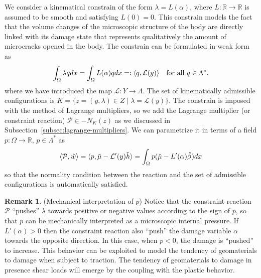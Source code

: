 \documentclass[a4paper,10pt,twoside]{amsbook}
\numberwithin{section}{chapter}
\numberwithin{equation}{chapter}
\theoremstyle{definition}
\newtheorem{rmk}[prop]{Remark}
\DeclarePairedDelimiter{\dual}{\langle}{\rangle}
\begin{document}
 We consider a kinematical constrain of the form $\lambda=L(\alpha)$, where $L\colon\mathbb{R}\to\mathbb{R}$ is assumed to be smooth and satisfying $L(0)=0$. This constrain models the fact that the volume changes of the microscopic structure of the body are directly linked with its damage state that represents qualitatively the amount of microcracks opened in the body. The constrain can be formulated in weak form as
\[
\int_\Omega\lambda qdx=\int_\Omega L(\alpha)qdx=:\dual{q,\mathcal{L}(y)}\quad\text{for all $q\in\Lambda^*$},
\]
where we have introduced the map $\mathcal{L}\colon Y\to\Lambda$. The set of kinematically admissible configurations is $K=\{z=(y,\lambda)\in Z\;|\;\lambda=\mathcal{L}(y)\}$. The constrain is imposed with the method of Lagrange multipliers, so we add the Lagrange multiplier (or constraint reaction) $\mathcal{P}\in-N_K(z)$ as we discussed in Subsection~\ref{subsec:lagrange-multipliers}. We can parametrize it in terms of a field $p\colon\Omega\to\mathbb{R}$, $p\in\Lambda^*$ as
\[
\dual{\mathcal{P},\tilde w}=\dual{p,\tilde\mu-\mathcal{L}'(y)\tilde h}=\int_\Omega p(\tilde\mu-L'(\alpha)\tilde\beta)dx
\]
so that the normality condition between the reaction and the set of admissible configurations is automatically satisfied.
\begin{rmk}(Mechanical interpretation of $p$)
\label{rmk:interpretation-of-p}
Notice that the constraint reaction $\mathcal{P}$ ``pushes'' $\lambda$ towards positive or negative values according to the sign of $p$, so that $p$ can be mechanically interpreted as a microscopic internal pressure. If $L'(\alpha)>0$ then the constraint reaction also ``push'' the damage variable $\alpha$ towards the opposite direction. In this case, when $p<0$, the damage is ``pushed'' to increase. This behavior can be exploited to model the tendency of geomaterials to damage when subject to traction. The tendency of geomaterials to damage in presence shear loads will emerge by the coupling with the plastic behavior.
\end{rmk}
\end{document}
